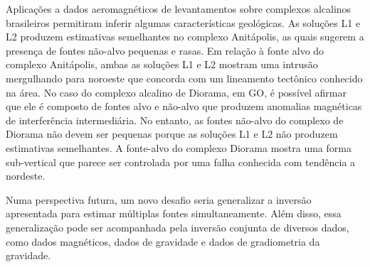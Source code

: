 Aplicações a dados aeromagnéticos de levantamentos sobre complexos alcalinos brasileiros permitiram inferir algumas características geológicas.
As soluções L1 e L2 produzem estimativas semelhantes no complexo Anitápolis, as quais sugerem a presença de fontes não-alvo pequenas e rasas.
Em relação à fonte alvo do complexo Anitápolis, ambas as soluções L1 e L2 mostram uma intrusão mergulhando para noroeste que concorda com um lineamento tectônico conhecido na área.
No caso do complexo alcalino de Diorama, em GO, é possível afirmar que ele é composto de fontes alvo e não-alvo que produzem anomalias magnéticas de interferência intermediária.
No entanto, as fontes não-alvo do complexo de Diorama não devem ser pequenas porque as soluções L1 e L2 não produzem estimativas semelhantes.
A fonte-alvo do complexo Diorama mostra uma forma sub-vertical que parece ser controlada por uma falha conhecida com tendência a nordeste.

Numa perspectiva futura, um novo desafio seria generalizar a inversão apresentada para estimar múltiplas fontes simultaneamente.
Além disso, essa generalização pode ser acompanhada pela inversão conjunta de diversos dados, como dados magnéticos, dados de gravidade e dados de gradiometria da gravidade.